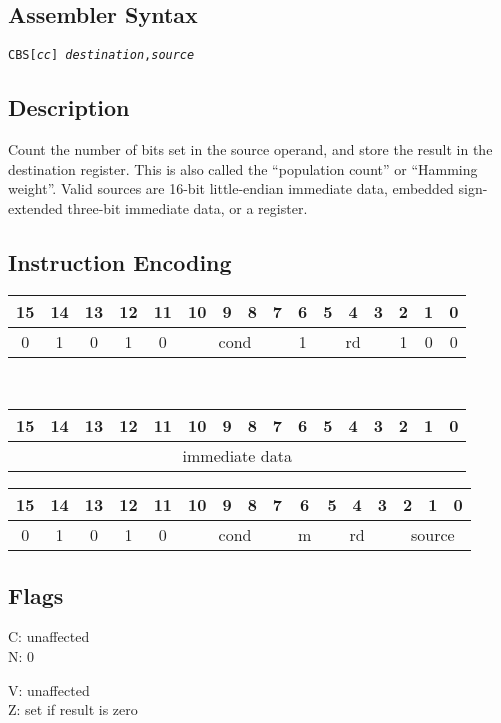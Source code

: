 \documentclass[11pt]{book}
\newcommand*{\encoding}[1]{\noindent
\begin{tabular}{|c|c|c|c|c|c|c|c|c|c|c|c|c|c|c|c|}
\multicolumn{1}{c}{15}&
\multicolumn{1}{c}{14}&
\multicolumn{1}{c}{13}&
\multicolumn{1}{c}{12}&
\multicolumn{1}{c}{11}&
\multicolumn{1}{c}{10}&
\multicolumn{1}{c}{9}&
\multicolumn{1}{c}{8}&
\multicolumn{1}{c}{7}&
\multicolumn{1}{c}{6}&
\multicolumn{1}{c}{5}&
\multicolumn{1}{c}{4}&
\multicolumn{1}{c}{3}&
\multicolumn{1}{c}{2}&
\multicolumn{1}{c}{1}&
\multicolumn{1}{c}{0}\\\hline
#1\\\hline
\end{tabular}}
\begin{document}
\subsection*{Assembler Syntax}
\texttt{CBS[\textit{cc}] \textit{destination},\textit{source}}

\subsection*{Description}
Count the number of bits set in the source operand,
and store the result in the destination register.
This is also called the ``population count'' or ``Hamming weight''.
Valid sources are 16-bit little-endian immediate data,
embedded sign-extended three-bit immediate data,
or a register.

\subsection*{Instruction Encoding}
\encoding{0&1&0&1&0%
&\multicolumn{4}{|c|}{cond}%
&1&\multicolumn{3}{|c|}{rd}&1&0&0}\\\null\qquad
\encoding{\multicolumn{16}{|c|}{immediate data}}

\vspace{2\baselineskip}
\encoding{0&1&0&1&0%
&\multicolumn{4}{|c|}{cond}%
&m&\multicolumn{3}{|c|}{rd}&\multicolumn{3}{|c|}{source}}

\subsection*{Flags}
\begin{multicols}{2}\noindent
  C: unaffected\\
  N: 0

  \columnbreak\noindent
  V: unaffected\\
  Z: set if result is zero
\end{multicols}
\end{document}
